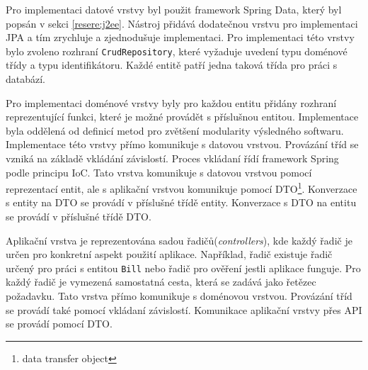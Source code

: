     Pro implementaci datové vrstvy byl použit framework Spring Data, který byl popsán v sekci \ref{resere:j2ee}. Nástroj přidává dodatečnou vrstvu pro implementaci JPA a tím zrychluje a zjednodušuje implementaci. Pro implementaci této vrstvy bylo zvoleno rozhraní \verb|CrudRepository|, které vyžaduje uvedení typu doménové třídy a typu identifikátoru. Každé entitě patří jedna taková třída pro práci s databází.
    
    Pro implementaci doménové vrstvy byly pro každou entitu přidány rozhraní reprezentující funkci, které je možné provádět s příslušnou entitou. Implementace byla oddělená od definicí metod pro zvětšení modularity výsledného softwaru. Implementace této vrstvy přímo komunikuje s datovou vrstvou. Provázání tříd se vzniká na základě vkládání závislostí. Proces vkládaní řídí framework Spring podle principu IoC. Tato vrstva komunikuje s datovou vrstvou pomocí reprezentací entit, ale s aplikační vrstvou komunikuje pomocí DTO\footnote{data transfer object}. Konverzace s entity na DTO se provádí v příslušné třídě entity. Konverzace s DTO na entitu se provádí v příslušné třídě DTO.
    
    Aplikační vrstva je reprezentována sadou řadičů(\textit{controllers}), kde každý řadič je určen pro konkretní aspekt použití aplikace. Například, řadič existuje řadič určený pro práci s entitou \verb|Bill| nebo řadič pro ověření jestli aplikace funguje. Pro každý řadič je vymezená samostatná cesta, která se zadává jako řetězec požadavku\cite{http-request-components}. Tato vrstva přímo komunikuje s doménovou vrstvou. Provázání tříd se provádí také pomocí vkládaní závislostí. Komunikace aplikační vrstvy přes API se provádí pomocí DTO.
    
